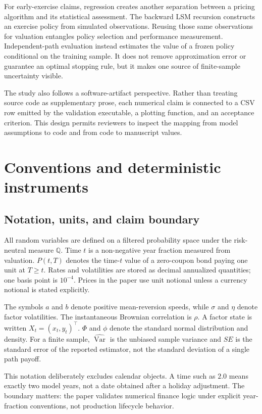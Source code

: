 \documentclass[11pt]{article}
\numberwithin{equation}{section}
\theoremstyle{definition}
\theoremstyle{remark}
\begin{document}
For early-exercise claims, regression creates another separation between a
pricing algorithm and its statistical assessment. The backward LSM recursion
constructs an exercise policy from simulated observations. Reusing those same
observations for valuation entangles policy selection and performance
measurement. Independent-path evaluation instead estimates the value of a
frozen policy conditional on the training sample. It does not remove
approximation error or guarantee an optimal stopping rule, but it makes one
source of finite-sample uncertainty visible.

The study also follows a software-artifact perspective. Rather than treating
source code as supplementary prose, each numerical claim is connected to a CSV
row emitted by the validation executable, a plotting function, and an
acceptance criterion. This design permits reviewers to inspect the mapping from
model assumptions to code and from code to manuscript values.

\section{Conventions and deterministic instruments}
\label{sec:conventions}

\subsection{Notation, units, and claim boundary}

All random variables are defined on a filtered probability space under the
risk-neutral measure $\mathbb{Q}$. Time $t$ is a non-negative year fraction
measured from valuation. $P(t,T)$ denotes the time-$t$ value of a zero-coupon
bond paying one unit at $T\geq t$. Rates and volatilities are stored as decimal
annualized quantities; one basis point is $10^{-4}$. Prices in the paper use
unit notional unless a currency notional is stated explicitly.

The symbols $a$ and $b$ denote positive mean-reversion speeds, while $\sigma$
and $\eta$ denote factor volatilities. The instantaneous Brownian correlation
is $\rho$. A factor state is written $X_t=(x_t,y_t)^\top$. $\Phi$ and $\phi$
denote the standard normal distribution and density. For a finite sample,
$\widehat{\operatorname{Var}}$ is the unbiased sample variance and $SE$ is the
standard error of the reported estimator, not the standard deviation of a
single path payoff.

This notation deliberately excludes calendar objects. A time such as $2.0$
means exactly two model years, not a date obtained after a holiday adjustment.
The boundary matters: the paper validates numerical finance logic under explicit
year-fraction conventions, not production lifecycle behavior.
\end{document}
